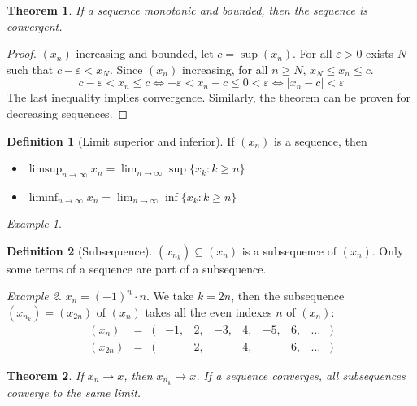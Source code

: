 \documentclass{article}
\newcommand{\abs}[1]{\left|#1\right|}
\newcommand{\limn}{\lim_{n \to \infty}}
\theoremstyle{definition}
\newtheorem{definition}{Definition}[section]
\theoremstyle{definition}
\theoremstyle{plain}
\newtheorem{theorem}{Theorem}[section]
\theoremstyle{plain}
\theoremstyle{plain}
\theoremstyle{plain}
\theoremstyle{definition}
\theoremstyle{remark}
\newtheorem{exampled}{Example}[definition]
\theoremstyle{remark}
\theoremstyle{remark}
\theoremstyle{remark}
\newcommand{\E}{\varepsilon}
\begin{document}
\begin{theorem}
  If a sequence monotonic and bounded, then the sequence is convergent.
\end{theorem}

\begin{proof}
  $(x_n)$ increasing and bounded, let $c = \sup(x_n)$. For all $\E > 0$ exists $N$ such that $c - \E < x_N$. Since $(x_n)$ increasing, for all $n \geq N$, $x_N \leq x_n \leq c$.
  \[
  c - \E < x_n \leq c \iff - \E < x_n - c \leq 0 < \E \iff
  \abs{x_n - c} < \E
  \]
  The last inequality implies convergence. Similarly, the theorem can be proven for decreasing sequences.
\end{proof}


\begin{definition}[Limit superior and inferior]
  If $(x_n)$ is a sequence, then
  \begin{itemize}
    \item $\limsup_{n \to \infty} x_n = \limn \sup\{x_k : k \geq n\}$
    \item $\liminf_{n \to \infty} x_n = \limn \inf\{x_k : k \geq n\}$
  \end{itemize}
\end{definition}

\begin{exampled}

\end{exampled}


\begin{definition}[Subsequence]
  $(x_{n_k}) \subseteq (x_n)$ is a subsequence of $(x_n)$. Only some terms of a sequence are part of a subsequence.
\end{definition}

\begin{exampled}
  $x_n = (-1)^n \cdot n$. We take $k = 2n$, then the subsequence
  $(x_{n_k}) = (x_{2n})$ of $(x_n)$ takes all the even indexes $n$ of $(x_n)$:
  \[
    \begin{array}{lcrcccccccl}
      (x_n)    & = & ( & -1, & 2, & -3, & 4, & -5, & 6, & \hdots & )\\
      (x_{2n}) & = & ( &     & 2, &     & 4, &     & 6, & \hdots & )
    \end{array}
  \]
\end{exampled}


\begin{theorem}
  If $x_n \to x$, then $x_{n_k} \to x$. If a sequence converges, all subsequences converge to the same limit.
\end{theorem}
\end{document}
